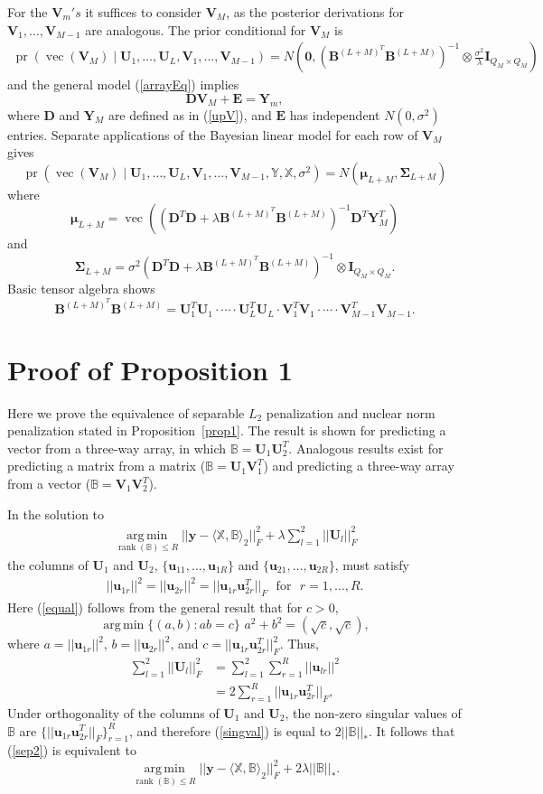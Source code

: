 \documentclass[12pt]{article}
\def\Y{\mathbf{Y}}
\def\I{\mathbf{I}}
\def\U{\mathbf{U}}
\def\u{\mathbf{u}}
\def\XX{\mathbb{X}}
\def\YY{\mathbb{Y}}
\def\E{\mathbf{E}}
\def\V{\mathbf{V}}
\def\B{\mathbf{B}}
\def\BB{\mathbb{B}}
\def\B{\mathbf{B}}
\def\D{\mathbf{D}}
\def\mmu{\boldsymbol{\mu}}
\def\SSigma{\boldsymbol{\Sigma}}
\newcommand{\tprod}[3] {
  \langle #1, #2 \rangle_{#3}}
\DeclareMathOperator*{\amin}{arg\,min}
\def\argmin#1{\underset{#1}{\amin}}
\DeclareMathOperator*{\rank}{rank}
\DeclareMathOperator*{\vect}{vec}
\DeclareMathOperator*{\pr}{pr}
\begin{document}
For the $\V_m's$ it suffices to consider $\V_M$, as the posterior derivations for $\V_1,\hdots,\V_{M-1}$ are analogous.  The prior conditional for $\V_M$ is
\begin{align*}
\pr(\vect(\V_M) \mid \U_1,\hdots,\U_L, \V_1,\hdots,\V_{M-1}) = N \left(\mathbf{0}, \left(\B^{(L+M)^T} \B^{(L+M)}\right)^{-1} \otimes  \frac{\sigma^2}{\lambda}  \I_{Q_M \times Q_M} \right )
\end{align*}
 and the general model (\ref{arrayEq}) implies 
 \[ \D \V_M + \E = \Y_m,\]
 where $\D$ and $\Y_M$ are defined as in (\ref{upV}), and $\E$ has independent $N(0,\sigma^2)$ entries.  Separate applications of the Bayesian linear model for each row of $\V_M$ gives 
\[\pr(\vect(\V_M) \mid \U_1, \hdots,\U_L, \V_1,\hdots,\V_{M-1}, \YY, \XX, \sigma^2) = N(\mmu_{L+M}, \SSigma_{L+M})\]
where 
\[\mmu_{L+M} = \vect ((\D^T \D + \lambda \B^{(L+M)^T}\B^{(L+M)})^{-1} \D^T \Y_M^T) \]
and 
\[\SSigma_{L+M} = \sigma^2 \left(\D^T\D + \lambda \B^{(L+M)^T}\B^{(L+M)}\right)^{-1} \otimes \I_{Q_M \times Q_M}.\]
Basic tensor algebra shows 
\[\B^{(L+M)^T} \B^{(L+M)} = \U_1^T \U_1 \cdot \cdots \cdot \U_L^T \U_L \cdot \V_1^T \V_1 \cdot \cdots \cdot  \V_{M-1}^T \V_{M-1}.\]
  
\section{Proof of Proposition 1} 
\label{propproof}

Here we prove the equivalence of separable $L_2$ penalization and nuclear norm penalization stated in Proposition~\ref{prop1}.  The result is shown for predicting a vector from a three-way array, in which $\BB=\U_1 \U_2^T$. Analogous results exist for predicting a matrix from a matrix ($\BB= \U_1 \V_1^T$) and predicting a three-way array from a vector ($\BB= \V_1 \V_2^T$).  

In the solution to
\begin{align}
 \argmin{\rank(\BB)\leq R} ||\mathbf{y}- \tprod{\XX}{\BB}{2}||_F^2 + \lambda \sum_{l=1}^2||\U_l||_F^2 \label{sep2}
 \end{align}
the columns of $\U_1$ and $\U_2$, $\{\u_{11},\hdots, \u_{1R}\}$ and  $\{\u_{21},\hdots, \u_{2R}\}$, must satisfy 
\begin{align}
||\u_{1r}||^2=||\u_{2r}||^2=||\u_{1r} \u_{2r}^T||_F  \, \, \text{ for } \, \, r=1,\hdots,R. \label{equal}	
\end{align}
 Here (\ref{equal}) follows from the general result that for $c>0$,
\[\argmin{} \{(a,b) : ab = c\} \, \, a^2+b^2  = (\sqrt{c},\sqrt{c}),\] 
where $a = ||\u_{1r}||^2$, $b = ||\u_{2r}||^2$, and $c = ||\u_{1r} \u_{2r}^T||_F^2$.  Thus,
\begin{align}
\sum_{l=1}^2||\U_l||_F^2 &= \sum_{l=1}^2 \sum_{r=1}^R ||\u_{lr}||^2 \nonumber \\
&= 2 \sum_{r=1}^R ||\u_{1r} \u_{2r}^T||_F, \label{singval}
\end{align}
Under orthogonality of the columns of $\U_1$ and $\U_2$, the non-zero singular values of $\BB$ are $\{||\u_{1r} \u_{2r}^T||_F\}_{r=1}^R$, and therefore (\ref{singval}) is equal to $2 ||\BB||_*$.  It follows that (\ref{sep2}) is equivalent to 
\[\argmin{\rank(\BB)\leq R} ||\mathbf{y}- \tprod{\XX}{\BB}{2}||_F^2 + 2 \lambda ||\BB||_*.\]     
\end{document}
